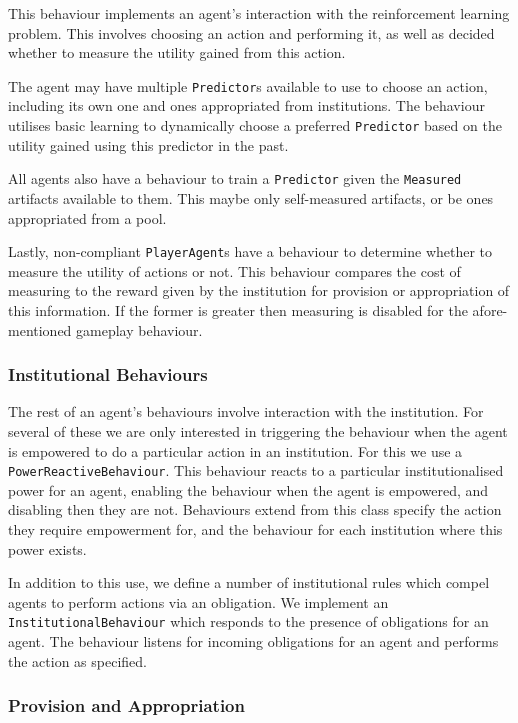 This behaviour implements an agent's interaction with the reinforcement
learning problem. This involves choosing an action and performing it, as well
as decided whether to measure the utility gained from this action.

The agent may have multiple \texttt{Predictor}s available to use to choose an
action, including its own one and ones appropriated from institutions. The
behaviour utilises basic learning to dynamically choose a preferred
\texttt{Predictor} based on the utility gained using this predictor in the
past.

All agents also have a behaviour to train a \texttt{Predictor} given the
\texttt{Measured} artifacts available to them. This maybe only self-measured
artifacts, or be ones appropriated from a pool.

Lastly, non-compliant \texttt{PlayerAgent}s have a behaviour to determine
whether to measure the utility of actions or not. This behaviour compares the
cost of measuring to the reward given by the institution for provision or
appropriation of this information. If the former is greater then measuring is
disabled for the afore-mentioned gameplay behaviour.

\subsubsection*{Institutional Behaviours}

The rest of an agent's behaviours involve interaction with the institution.
For several of these we are only interested in triggering the behaviour when
the agent is empowered to do a particular action in an institution. For this
we use a \texttt{PowerReactiveBehaviour}. This behaviour reacts to a
particular institutionalised power for an agent, enabling the behaviour when
the agent is empowered, and disabling then they are not. Behaviours extend
from this class specify the action they require empowerment for, and the
behaviour for each institution where this power exists.

In addition to this use, we define a number of institutional rules which
compel agents to perform actions via an obligation. We implement an
\texttt{InstitutionalBehaviour} which responds to the presence of obligations
for an agent. The behaviour listens for incoming obligations for an agent and
performs the action as specified. 

\subsubsection*{Provision and Appropriation}

